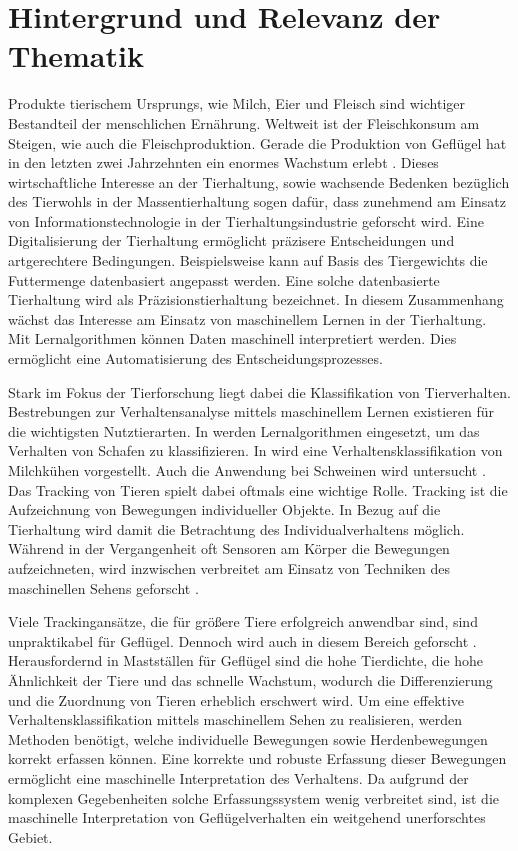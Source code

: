 \section{Hintergrund und Relevanz der Thematik} \label{sec:Hintergrund}
Produkte tierischem Ursprungs, wie Milch, Eier und Fleisch sind wichtiger Bestandteil der menschlichen Ernährung. Weltweit ist der Fleischkonsum am Steigen, wie auch die Fleischproduktion. Gerade die Produktion von Geflügel hat in den letzten zwei Jahrzehnten ein enormes Wachstum erlebt \cite{StatistischesBundesamt.20200212}. Dieses wirtschaftliche Interesse an der Tierhaltung, sowie wachsende Bedenken bezüglich des Tierwohls in der Massentierhaltung sogen dafür, dass zunehmend am Einsatz von Informationstechnologie in der Tierhaltungsindustrie geforscht wird. Eine Digitalisierung der Tierhaltung ermöglicht präzisere Entscheidungen und artgerechtere Bedingungen. Beispielsweise kann auf Basis des Tiergewichts die Futtermenge datenbasiert angepasst werden. Eine solche datenbasierte Tierhaltung wird als Präzisionstierhaltung bezeichnet. In diesem Zusammenhang wächst das Interesse am Einsatz von maschinellem Lernen in der Tierhaltung. Mit Lernalgorithmen können Daten maschinell interpretiert werden. Dies ermöglicht eine Automatisierung des Entscheidungsprozesses\cite{Garcia.2020}.\par

Stark im Fokus der Tierforschung liegt dabei die Klassifikation von Tierverhalten. Bestrebungen zur Verhaltensanalyse mittels maschinellem Lernen existieren für die wichtigsten Nutztierarten. In \cite{VazquezDiosdado.2019} werden Lernalgorithmen eingesetzt, um das Verhalten von Schafen zu klassifizieren. In \cite{VazquezDiosdado.2015} wird eine Verhaltensklassifikation von Milchkühen vorgestellt. Auch die Anwendung bei Schweinen wird untersucht \cite{Tran.2023}. Das Tracking von Tieren spielt dabei oftmals eine wichtige Rolle. Tracking ist die Aufzeichnung von Bewegungen individueller Objekte. In Bezug auf die Tierhaltung wird damit die Betrachtung des Individualverhaltens möglich. Während in der Vergangenheit oft Sensoren am Körper die Bewegungen aufzeichneten, wird inzwischen verbreitet am Einsatz von Techniken des maschinellen Sehens geforscht \cite{Cowton.2019, Li.2020, Chen.2023}.\par

Viele Trackingansätze, die für größere Tiere erfolgreich anwendbar sind, sind unpraktikabel für Geflügel. Dennoch wird auch in diesem Bereich geforscht \cite{Chen.2023, Gonzalez.2020, Nasirahmadi.2020}. Herausfordernd in Mastställen für Geflügel sind die hohe Tierdichte, die hohe Ähnlichkeit der Tiere und das schnelle Wachstum, wodurch die Differenzierung und die Zuordnung von Tieren erheblich erschwert wird. Um eine effektive Verhaltensklassifikation mittels maschinellem Sehen zu realisieren, werden Methoden benötigt, welche individuelle Bewegungen sowie Herdenbewegungen korrekt erfassen können. Eine korrekte und robuste Erfassung dieser Bewegungen ermöglicht eine maschinelle Interpretation des Verhaltens. Da aufgrund der komplexen Gegebenheiten solche Erfassungssystem wenig verbreitet sind, ist die maschinelle Interpretation von Geflügelverhalten ein weitgehend unerforschtes Gebiet. \par

